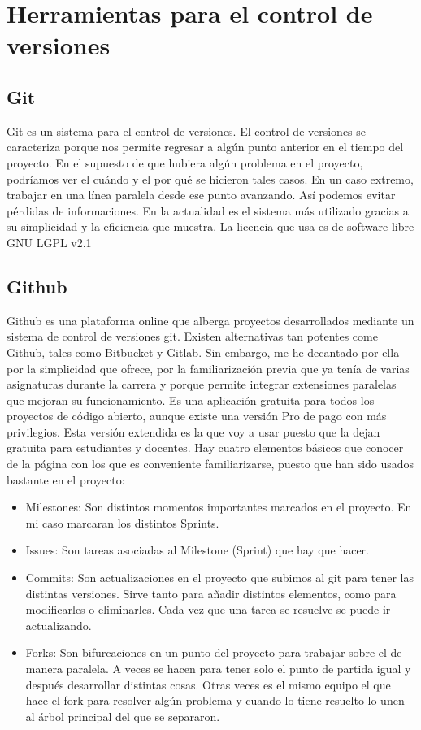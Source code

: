 \section{Herramientas para el control de versiones}
\subsection{Git}
Git es un sistema para el control de versiones.
El control de versiones se caracteriza porque nos permite regresar a algún punto anterior en el tiempo del proyecto. En el supuesto de que hubiera algún problema en el proyecto, podríamos ver el cuándo y el por qué se hicieron tales casos. En un caso extremo, trabajar en una línea paralela desde ese punto avanzando. Así podemos evitar pérdidas de informaciones.
En la actualidad es el sistema más utilizado gracias a su simplicidad y la eficiencia que muestra.
La licencia que usa es de software libre GNU LGPL v2.1
\subsection{Github}
Github es una plataforma online que alberga proyectos desarrollados mediante un sistema de control de versiones git.
Existen alternativas tan potentes come Github, tales como Bitbucket y Gitlab. Sin embargo, me he decantado por ella por la simplicidad que ofrece, por la familiarización previa que ya tenía de varias asignaturas durante la carrera y porque permite integrar extensiones paralelas que mejoran su funcionamiento.
Es una aplicación gratuita para todos los proyectos de código abierto, aunque existe una versión Pro de pago con más privilegios. Esta versión extendida es la que voy a usar puesto que la dejan gratuita para estudiantes y docentes.
Hay cuatro elementos básicos que conocer de la página con los que es conveniente familiarizarse, puesto que han sido usados bastante en el proyecto:
\begin{itemize}
    \item Milestones: Son distintos momentos importantes marcados en el proyecto. En mi caso marcaran los distintos Sprints.
    \item Issues: Son tareas asociadas al Milestone (Sprint) que hay que hacer.
    \item Commits: Son actualizaciones en el proyecto que subimos al git para tener las distintas versiones. Sirve tanto para añadir distintos elementos, como para modificarles o eliminarles. Cada vez que una tarea se resuelve se puede ir actualizando.
    \item Forks: Son bifurcaciones en un punto del proyecto para trabajar sobre el de manera paralela. A veces se hacen para tener solo el punto de partida igual y después desarrollar distintas cosas. Otras veces es el mismo equipo el que hace el fork para resolver algún problema y cuando lo tiene resuelto lo unen al árbol principal del que se separaron.
\end{itemize}
